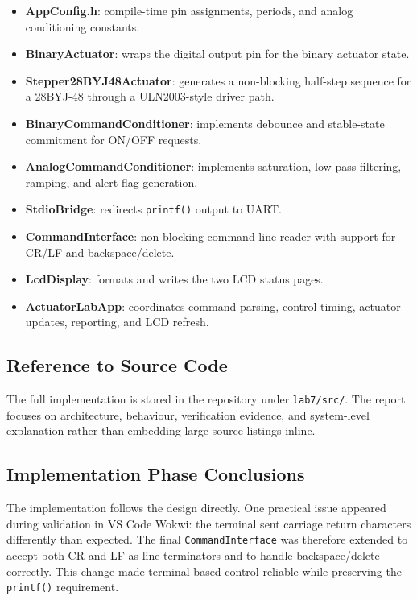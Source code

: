 \documentclass[12pt]{article}
\begin{document}
\begin{itemize}
    \item \textbf{AppConfig.h}: compile-time pin assignments, periods, and analog conditioning constants.
    \item \textbf{BinaryActuator}: wraps the digital output pin for the binary actuator state.
    \item \textbf{Stepper28BYJ48Actuator}: generates a non-blocking half-step sequence for a 28BYJ-48 through a ULN2003-style driver path.
    \item \textbf{BinaryCommandConditioner}: implements debounce and stable-state commitment for ON/OFF requests.
    \item \textbf{AnalogCommandConditioner}: implements saturation, low-pass filtering, ramping, and alert flag generation.
    \item \textbf{StdioBridge}: redirects \texttt{printf()} output to UART.
    \item \textbf{CommandInterface}: non-blocking command-line reader with support for CR/LF and backspace/delete.
    \item \textbf{LcdDisplay}: formats and writes the two LCD status pages.
    \item \textbf{ActuatorLabApp}: coordinates command parsing, control timing, actuator updates, reporting, and LCD refresh.
\end{itemize}

\subsection{Reference to Source Code}

The full implementation is stored in the repository under \texttt{lab7/src/}. The report focuses on architecture, behaviour, verification evidence, and system-level explanation rather than embedding large source listings inline.

\subsection{Implementation Phase Conclusions}
\hspace{0.8cm} The implementation follows the design directly. One practical issue appeared during validation in VS Code Wokwi: the terminal sent carriage return characters differently than expected. The final \texttt{CommandInterface} was therefore extended to accept both CR and LF as line terminators and to handle backspace/delete correctly. This change made terminal-based control reliable while preserving the \texttt{printf()} requirement.
\end{document}
